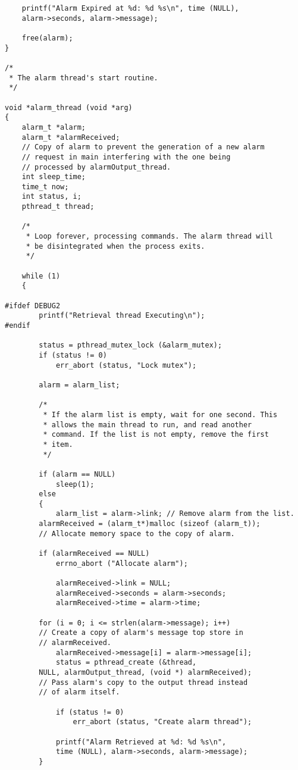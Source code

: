 \documentclass[11pt]{article}
\begin{document}
\begin{lstlisting}
    printf("Alarm Expired at %d: %d %s\n", time (NULL), 
	alarm->seconds, alarm->message);
    
    free(alarm);
}

/*
 * The alarm thread's start routine.
 */
 
void *alarm_thread (void *arg)
{
    alarm_t *alarm;
    alarm_t *alarmReceived; 
	// Copy of alarm to prevent the generation of a new alarm 
	// request in main interfering with the one being 
	// processed by alarmOutput_thread.
    int sleep_time;
    time_t now;
    int status, i;
    pthread_t thread;

    /*
     * Loop forever, processing commands. The alarm thread will
     * be disintegrated when the process exits.
     */
	 
    while (1)
    {

#ifdef DEBUG2
		printf("Retrieval thread Executing\n");
#endif
    	
    	status = pthread_mutex_lock (&alarm_mutex);
		if (status != 0)
            err_abort (status, "Lock mutex");

        alarm = alarm_list;

        /*
         * If the alarm list is empty, wait for one second. This
         * allows the main thread to run, and read another
         * command. If the list is not empty, remove the first
         * item.
         */
		 
        if (alarm == NULL)
            sleep(1);
        else
        {
            alarm_list = alarm->link; // Remove alarm from the list.
		alarmReceived = (alarm_t*)malloc (sizeof (alarm_t)); 
		// Allocate memory space to the copy of alarm.
	
		if (alarmReceived == NULL)
           	errno_abort ("Allocate alarm");
            	
        	alarmReceived->link = NULL;
        	alarmReceived->seconds = alarm->seconds;
        	alarmReceived->time = alarm->time;
        
        for (i = 0; i <= strlen(alarm->message); i++) 
		// Create a copy of alarm's message top store in 
		// alarmReceived.
        	alarmReceived->message[i] = alarm->message[i];
        	status = pthread_create (&thread, 
		NULL, alarmOutput_thread, (void *) alarmReceived); 
		// Pass alarm's copy to the output thread instead
		// of alarm itself.
			
        	if (status != 0)
        	    err_abort (status, "Create alarm thread");

			printf("Alarm Retrieved at %d: %d %s\n", 
			time (NULL), alarm->seconds, alarm->message);
		}
		

\end{lstlisting}
\end{document}
